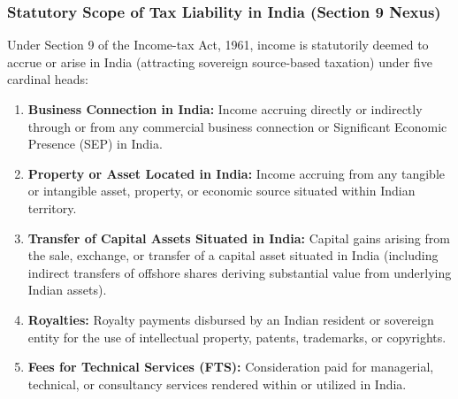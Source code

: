 \subsubsection{Statutory Scope of Tax Liability in India (Section 9 Nexus)}
Under Section 9 of the Income-tax Act, 1961, income is statutorily deemed to accrue or arise in India (attracting sovereign source-based taxation) under five cardinal heads:
\begin{enumerate}[leftmargin=1.8em, label=\textbf{\arabic*.}]
    \item \textbf{Business Connection in India:} Income accruing directly or indirectly through or from any commercial business connection or Significant Economic Presence (SEP) in India.
    \item \textbf{Property or Asset Located in India:} Income accruing from any tangible or intangible asset, property, or economic source situated within Indian territory.
    \item \textbf{Transfer of Capital Assets Situated in India:} Capital gains arising from the sale, exchange, or transfer of a capital asset situated in India (including indirect transfers of offshore shares deriving substantial value from underlying Indian assets).
    \item \textbf{Royalties:} Royalty payments disbursed by an Indian resident or sovereign entity for the use of intellectual property, patents, trademarks, or copyrights.
    \item \textbf{Fees for Technical Services (FTS):} Consideration paid for managerial, technical, or consultancy services rendered within or utilized in India.
\end{enumerate}

\vspace{0.3em}

